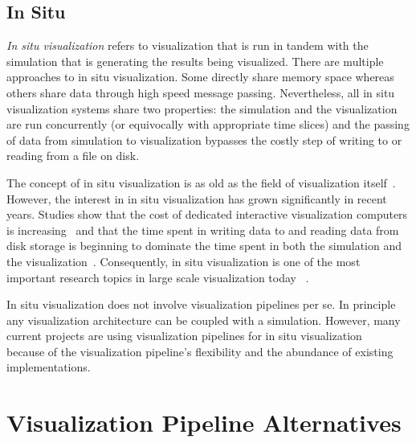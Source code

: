 \documentclass[journal,twocolumn,10pt,letterpaper,twoside]{IEEEtran}
\newcommand*{\lcite}[1]{~\cite{#1}}
\newcommand*{\keyterm}[1]{\emph{#1}}
\newcommand{\fix}[1]{}
\begin{document}
\fix{To my knowledge there is not yet a publication of hyperflow other than
  Huy's dissertation.  However, I'm sure Huy and Claudio are submitting it
  if it has not already been accepted.  Perhaps it will show up at IEEE
  Vis.}

\subsection{In Situ}
\label{sec:InSitu}

\keyterm{In situ visualization} refers to visualization that is run in
tandem with the simulation that is generating the results being
visualized.  There are multiple approaches to in situ visualization.  Some
directly share memory space whereas others share data through high speed
message passing.  Nevertheless, all in situ visualization systems share two
properties: the simulation and the visualization are run concurrently (or
equivocally with appropriate time slices) and the passing of data from
simulation to visualization bypasses the costly step of writing to or
reading from a file on disk.

The concept of in situ visualization is as old as the field of
visualization itself\lcite{ViSC1987}.  However, the interest in in situ
visualization has grown significantly in recent years.  Studies show
that the cost of dedicated interactive visualization computers is
increasing\lcite{Childs2007} and that the time spent in writing data to and
reading data from disk storage is beginning to dominate the time spent in
both the simulation and the
visualization\lcite{Ross2008,Peterka2008,Peterka2009}.  Consequently, in
situ visualization is one of the most important research topics in large
scale visualization today%
\lcite{VisualizationKnowledgeDiscovery2007,ScientificDiscoveryExascale2011}.

In situ visualization does not involve visualization pipelines per se.  In
principle any visualization architecture can be coupled with a simulation.
However, many current projects are using visualization pipelines for in
situ visualization%
\lcite{Biddiscombe2011,Fabian2011,Johnson1999,Klasky2011,Moreland2011:PDAC,VisItLibsim}
because of the visualization pipeline's flexibility and the abundance of
existing implementations.


\section{Visualization Pipeline Alternatives}
\label{sec:Alternatives}
\end{document}
